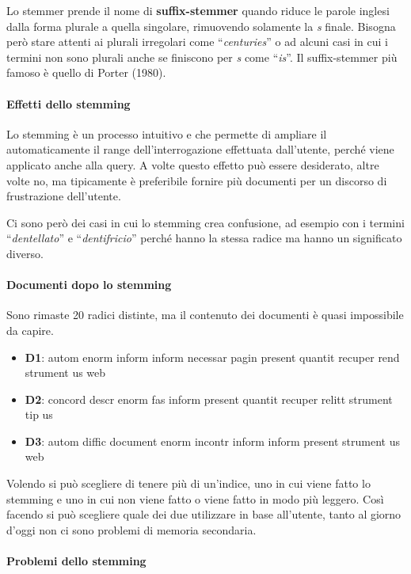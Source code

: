 Lo stemmer prende il nome di \textbf{suffix-stemmer} quando riduce le parole inglesi dalla forma plurale a quella singolare, rimuovendo solamente la \textit{s} finale. Bisogna però stare attenti ai plurali irregolari come ``\textit{centuries}'' o ad alcuni casi in cui i termini non sono plurali anche se finiscono per \textit{s} come ``\textit{is}''. Il suffix-stemmer più famoso è quello di Porter (1980).

\paragraph{Effetti dello stemming}

Lo stemming è un processo intuitivo e che permette di ampliare il automaticamente il range dell'interrogazione effettuata dall'utente, perché viene applicato anche alla query. A volte questo effetto può essere desiderato, altre volte no, ma tipicamente è preferibile fornire più documenti per un discorso di frustrazione dell'utente.

Ci sono però dei casi in cui lo stemming crea confusione, ad esempio con i termini ``\textit{dentellato}'' e ``\textit{dentifricio}'' perché hanno la stessa radice ma hanno un significato diverso.

\paragraph{Documenti dopo lo stemming}
Sono rimaste 20 radici distinte, ma il contenuto dei documenti è quasi impossibile da capire.

\begin{itemize}
	\item \textbf{D1}: autom enorm inform inform necessar pagin present quantit recuper rend strument us web
	\item \textbf{D2}: concord descr enorm fas inform present quantit recuper relitt strument tip us
	\item \textbf{D3}: autom diffic document enorm incontr inform inform present strument us web
\end{itemize}

Volendo si può scegliere di tenere più di un'indice, uno in cui viene fatto lo stemming e uno in cui non viene fatto o viene fatto in modo più leggero. Così facendo si può scegliere quale dei due utilizzare in base all'utente, tanto al giorno d'oggi non ci sono problemi di memoria secondaria.

\paragraph{Problemi dello stemming}

